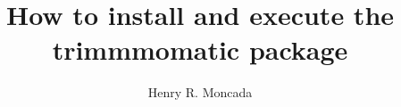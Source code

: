 \documentclass{article}
\begin{document}

\title{How to install and execute the  trimmmomatic package}
\author{Henry R. Moncada}
\maketitle
\tableofcontents        %


\end{document}
